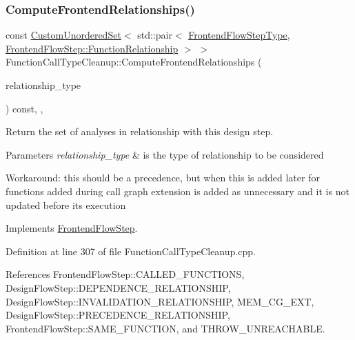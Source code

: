 \subsubsection{\texorpdfstring{Compute\+Frontend\+Relationships()}{ComputeFrontendRelationships()}}
{\footnotesize\ttfamily const \hyperlink{classCustomUnorderedSet}{Custom\+Unordered\+Set}$<$ std\+::pair$<$ \hyperlink{frontend__flow__step_8hpp_afeb3716c693d2b2e4ed3e6d04c3b63bb}{Frontend\+Flow\+Step\+Type}, \hyperlink{classFrontendFlowStep_af7cf30f2023e5b99e637dc2058289ab0}{Frontend\+Flow\+Step\+::\+Function\+Relationship} $>$ $>$ Function\+Call\+Type\+Cleanup\+::\+Compute\+Frontend\+Relationships (\begin{DoxyParamCaption}\item[{const \hyperlink{classDesignFlowStep_a723a3baf19ff2ceb77bc13e099d0b1b7}{Design\+Flow\+Step\+::\+Relationship\+Type}}]{relationship\+\_\+type }\end{DoxyParamCaption}) const\hspace{0.3cm}{\ttfamily [override]}, {\ttfamily [private]}, {\ttfamily [virtual]}}



Return the set of analyses in relationship with this design step. 


\begin{DoxyParams}{Parameters}
{\em relationship\+\_\+type} & is the type of relationship to be considered \\
\hline
\end{DoxyParams}
Workaround\+: this should be a precedence, but when this is added later for functions added during call graph extension is added as unnecessary and it is not updated before its execution 

Implements \hyperlink{classFrontendFlowStep_abeaff70b59734e462d347ed343dd700d}{Frontend\+Flow\+Step}.



Definition at line 307 of file Function\+Call\+Type\+Cleanup.\+cpp.



References Frontend\+Flow\+Step\+::\+C\+A\+L\+L\+E\+D\+\_\+\+F\+U\+N\+C\+T\+I\+O\+NS, Design\+Flow\+Step\+::\+D\+E\+P\+E\+N\+D\+E\+N\+C\+E\+\_\+\+R\+E\+L\+A\+T\+I\+O\+N\+S\+H\+IP, Design\+Flow\+Step\+::\+I\+N\+V\+A\+L\+I\+D\+A\+T\+I\+O\+N\+\_\+\+R\+E\+L\+A\+T\+I\+O\+N\+S\+H\+IP, M\+E\+M\+\_\+\+C\+G\+\_\+\+E\+XT, Design\+Flow\+Step\+::\+P\+R\+E\+C\+E\+D\+E\+N\+C\+E\+\_\+\+R\+E\+L\+A\+T\+I\+O\+N\+S\+H\+IP, Frontend\+Flow\+Step\+::\+S\+A\+M\+E\+\_\+\+F\+U\+N\+C\+T\+I\+ON, and T\+H\+R\+O\+W\+\_\+\+U\+N\+R\+E\+A\+C\+H\+A\+B\+LE.

